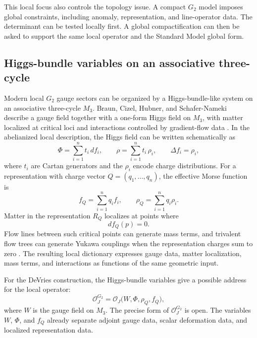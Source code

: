 This local focus also controls the topology issue.  A compact \(G_2\) model imposes global constraints, including anomaly, representation, and line-operator data.  The determinant can be tested locally first.  A global compactification can then be asked to support the same local operator and the Standard Model global form.

\subsection{Higgs-bundle variables on an associative three-cycle}
\label{sec:g2-higgs-bundle-variables}

Modern local \(G_2\) gauge sectors can be organized by a Higgs-bundle-like system on an associative three-cycle \(M_3\).  Braun, Cizel, Hubner, and Schafer-Nameki describe a gauge field together with a one-form Higgs field on \(M_3\), with matter localized at critical loci and interactions controlled by gradient-flow data \cite{BraunEtAl2019}.  In the abelianized local description, the Higgs field can be written schematically as
\begin{equation}
  \Phi=\sum_{i=1}^n t_i\,df_i,
  \qquad
  \rho=\sum_{i=1}^n t_i\,\rho_i,
  \qquad
  \Delta f_i=\rho_i,
  \label{eq:g2-higgs-bundle-data}
\end{equation}
where \(t_i\) are Cartan generators and the \(\rho_i\) encode charge distributions.  For a representation with charge vector \(Q=(q_1,\ldots,q_n)\), the effective Morse function is
\begin{equation}
  f_Q=\sum_{i=1}^n q_i f_i,
  \qquad
  \rho_Q=\sum_{i=1}^n q_i\rho_i.
  \label{eq:g2-effective-morse}
\end{equation}
Matter in the representation \(R_Q\) localizes at points where
\begin{equation}
  df_Q(p)=0.
  \label{eq:g2-localization-condition}
\end{equation}
Flow lines between such critical points can generate mass terms, and trivalent
flow trees can generate Yukawa couplings when the representation charges sum to
zero \cite{BraunEtAl2019}.  The resulting local dictionary expresses gauge
data, matter localization, mass terms, and interactions as functions of the same
geometric input.

For the DeVries construction, the Higgs-bundle variables give a possible address for the local operator:
\begin{equation}
  \mathcal O_J^{G_2}
  =
  \mathcal O_J\big(W,\Phi,\rho_Q,f_Q\big),
  \label{eq:g2-operator-address}
\end{equation}
where \(W\) is the gauge field on \(M_3\).  The precise form of \(\mathcal O_J^{G_2}\) is open.  The variables \(W\), \(\Phi\), and \(f_Q\) already separate adjoint gauge data, scalar deformation data, and localized representation data.


